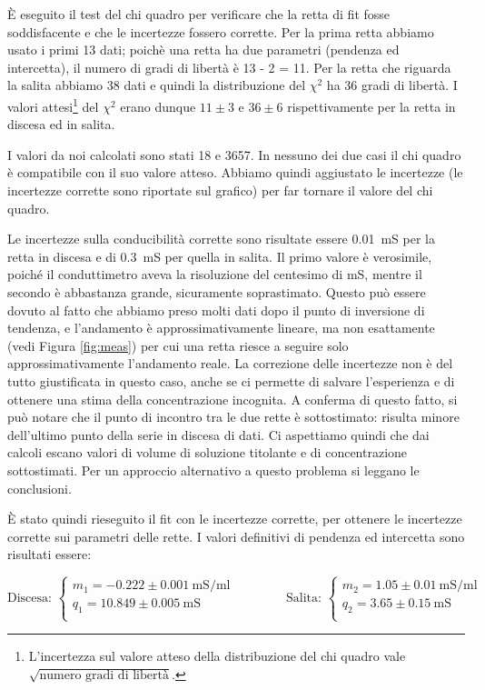 \`E eseguito il test del chi quadro per verificare che la retta di fit fosse soddisfacente e che le incertezze fossero corrette.
Per la prima retta abbiamo usato i primi 13 dati; poichè una retta ha due parametri (pendenza ed intercetta),
il numero di gradi di libertà è 13 - 2 = 11. Per la retta che riguarda la salita abbiamo 38 dati e quindi la distribuzione del $\chi^2$ ha 36 gradi di libertà.
I valori attesi\footnote{L'incertezza sul valore atteso della distribuzione del chi quadro vale $\sqrt{\text{numero gradi di libertà}}$.} del $\chi^2$ erano
dunque $11 \pm 3$ e $36 \pm 6$ rispettivamente per la retta in discesa ed in salita.

I valori da noi calcolati sono stati 18 e 3657. In nessuno dei due casi il chi quadro è compatibile con il suo valore atteso.
Abbiamo quindi aggiustato le incertezze (le incertezze corrette sono riportate sul grafico) per far tornare il valore del chi quadro. 

Le incertezze sulla conducibilità corrette sono risultate essere \SI{0.01}{\milli\siemens} per la retta in discesa e di
\SI{0.3}{\milli\siemens} per quella in salita. Il primo valore è verosimile, poiché il conduttimetro aveva la risoluzione del centesimo di mS, mentre
il secondo è abbastanza grande, sicuramente soprastimato. Questo può essere dovuto al fatto che abbiamo preso molti dati dopo il punto di inversione di tendenza,
e l'andamento è approssimativamente lineare, ma non esattamente (vedi Figura \ref{fig:meas}) per cui una retta riesce a seguire solo approssimativamente
l'andamento reale. La correzione delle incertezze non è del tutto giustificata in questo caso, anche se ci permette di salvare l'esperienza e di ottenere una stima
della concentrazione incognita. A conferma di questo fatto, si può notare che il punto di incontro tra le due rette è sottostimato: risulta minore dell'ultimo punto della serie
in discesa di dati. Ci aspettiamo quindi che dai calcoli escano valori di volume di soluzione titolante e di concentrazione sottostimati.
Per un approccio alternativo a questo problema si leggano le conclusioni.

È stato quindi rieseguito il fit con le incertezze corrette, per ottenere le incertezze corrette sui parametri delle rette.
I valori definitivi di pendenza ed intercetta sono risultati essere:

\begin{equation*}
    \text{Discesa: }
    \left\{    
    \begin{array}{l}
        m_1 = -0.222 \pm 0.001 ~ \si{\milli\siemens\per\milli\litre} \\
        q_1 = 10.849 \pm 0.005 ~ \si{\milli\siemens} \\
    \end{array}
    \right.
    \qquad
    \qquad
    \text{Salita: }
    \left\{    
        \begin{array}{l}
        m_2 = 1.05 \pm 0.01 ~ \si{\milli\siemens\per\milli\litre} \\
        q_2 = 3.65 \pm 0.15 ~ \si{\milli\siemens} \\
    \end{array}
    \right.
\end{equation*}

